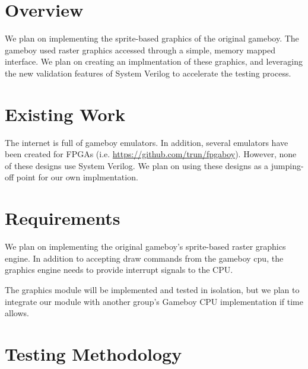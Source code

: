 \documentclass{article}
\begin{document}
\newenvironment{frcseries}{\fontfamily{frc}\selectfont}{}
\newcommand{\textfrc}[1]{{\frcseries#1}}
\newcommand{\mathfrc}[1]{\text{\textfrc{#1}}}




\section{Overview}
We plan on implementing the sprite-based graphics of the original
gameboy. The gameboy used raster graphics accessed through a simple,
memory mapped interface. We plan on creating an implmentation of these
graphics, and leveraging the new validation features of System Verilog
to accelerate the testing process. 

\section{Existing Work}
The internet is full of gameboy emulators. In addition, several
emulators have been created for FPGAs (i.e.
\url{https://github.com/trun/fpgaboy}). However, none of these designs
use System Verilog. We plan on using these designs as a jumping-off
point for our own implmentation.

\section{Requirements}

We plan on implementing the original gameboy's sprite-based raster
graphics engine. In addition to accepting draw commands from the
gameboy cpu, the graphics engine needs to provide interrupt signals to
the CPU. 

The graphics module will be implemented and tested in isolation, but we plan to integrate our module with another group's Gameboy CPU implementation if time allows.

\section{Testing Methodology}
\end{document}
